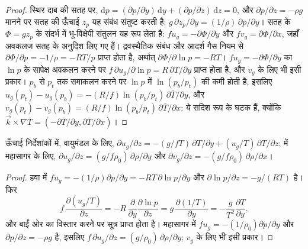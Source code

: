 \begin{proof}
स्थिर दाब की सतह पर, $\mathrm dp = (\partial p/\partial y)
\,\mathrm dy + (\partial p/\partial z)\,\mathrm dz = 0$, और
$\partial p/\partial z = -\rho g$ मानने पर सतह की ऊँचाई $z_p$ यह संबंध संतुष्ट करती है:
$g\,\partial z_p/\partial y = (1/\rho)\,\partial p/\partial y$। सतह के
 $\Phi = gz_p$ के संदर्भ में भू-विक्षेपी संतुलन यह रूप लेता है:
$fu_g = -\partial\Phi/\partial y$ और $fv_g = \partial\Phi/\partial x$, जहाँ
अवकलज सतह के अनुदिश लिए गए हैं। द्रवस्थैतिक संबंध और
आदर्श गैस नियम से $\partial\Phi/\partial p = -1/\rho = -RT/p$ प्राप्त होता है, अर्थात्
$\partial\Phi/\partial\ln p = -RT$। $fu_g =
-\partial\Phi/\partial y$ का $\ln p$ के सापेक्ष अवकलन करने पर $f\,\partial
u_g/\partial\ln p = R\,\partial T/\partial y$ प्राप्त होता है, और $v_g$ के लिए भी इसी प्रकार।
$p_b$ से $p_t$ तक समाकलन करने पर $\ln p$ में $\ln(p_b/p_t)$ की कमी होती है, इसलिए
$u_g(p_t) - u_g(p_b) = -(R/f)\ln(p_b/p_t)\,\partial\bar T/\partial y$, और
$v_g(p_t) - v_g(p_b) = (R/f)\ln(p_b/p_t)\,\partial\bar T/\partial x$: ये
सदिश रूप के घटक हैं, क्योंकि $\vec k\times\nabla\bar T =
(-\partial\bar T/\partial y, \partial\bar T/\partial x)$।
\end{proof}

\begin{corollary}[ऊँचाई में ऊष्मीय पवन]\label{cor:b3:gfd-foundations:thermal-wind-z}
ऊँचाई निर्देशांकों में, वायुमंडल के लिए, $\partial u_g/\partial z =
-(g/fT)\,\partial T/\partial y + (u_g/T)\,\partial T/\partial z$;  में
महासागर के लिए, $\partial u_g/\partial z =
(g/f\rho_0)\,\partial\rho/\partial y$ और $\partial v_g/\partial z =
-(g/f\rho_0)\,\partial\rho/\partial x$।
\end{corollary}

\begin{proof}
हवा में $fu_g = -(1/\rho)\partial p/\partial y = -RT\,\partial\ln
p/\partial y$ और $\partial\ln p/\partial z = -g/(RT)$ है। फिर
\[
f\,\frac{\partial(u_g/T)}{\partial z} = -R\,\frac{\partial}{\partial y}\frac{\partial\ln p}{\partial z}
= g\,\frac{\partial(1/T)}{\partial y} = -\frac{g}{T^2}\frac{\partial T}{\partial y} ,
\]
और बाईं ओर का विस्तार करने पर सूत्र प्राप्त होता है। महासागर में $fu_g = -(1/\rho_0)\partial
p/\partial y$ और $\partial p/\partial z = -\rho g$ है, इसलिए $f\,\partial u_g/
\partial z = (g/\rho_0)\,\partial\rho/\partial y$; $v_g$ के लिए भी इसी प्रकार।
\end{proof}

